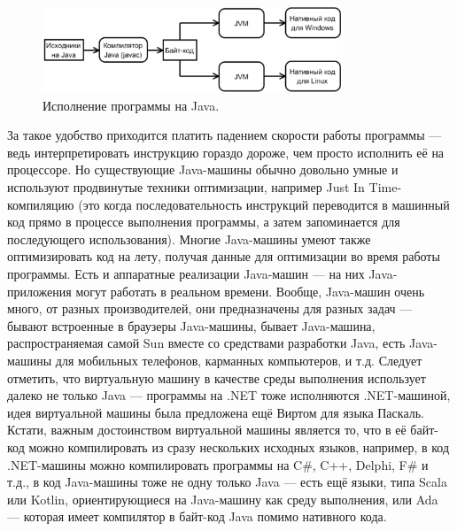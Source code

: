\documentclass[a5paper]{article}
\begin{document}
\begin{figure}
	\begin{center}
		\includegraphics[width=0.8\textwidth]{javaCompiling.png}
	\end{center}
	\caption{Исполнение программы на Java.}
	\label{figure1}
\end{figure}

За такое удобство приходится платить падением скорости работы программы --- ведь интерпретировать инструкцию гораздо дороже, чем просто исполнить её на процессоре. Но существующие Java-машины обычно довольно умные и используют продвинутые техники оптимизации, например Just In Time-компиляцию (это когда последовательность инструкций переводится в машинный код прямо в процессе выполнения программы, а затем запоминается для последующего использования). Многие Java-машины умеют также оптимизировать код на лету, получая данные для оптимизации во время работы программы. Есть и аппаратные реализации Java-машин --- на них Java-приложения могут работать в реальном времени. Вообще, Java-машин очень много, от разных производителей, они предназначены для разных задач --- бывают встроенные в браузеры Java-машины, бывает Java-машина, распространяемая самой Sun вместе со средствами разработки Java, есть Java-машины для мобильных телефонов, карманных компьютеров, и т.д. Следует отметить, что виртуальную машину в качестве среды выполнения использует далеко не только Java --- программы на .NET тоже исполняются .NET-машиной, идея виртуальной машины была предложена ещё Виртом для языка Паскаль. Кстати, важным достоинством виртуальной машины является то, что в её байт-код можно компилировать из сразу нескольких исходных языков, например, в код .NET-машины можно компилировать программы на C\#, C++, Delphi, F\# и т.д., в код Java-машины тоже не одну только Java --- есть ещё языки, типа Scala или Kotlin, ориентирующиеся на Java-машину как среду выполнения, или Ada --- которая имеет компилятор в байт-код Java помимо нативного кода.
\end{document}
